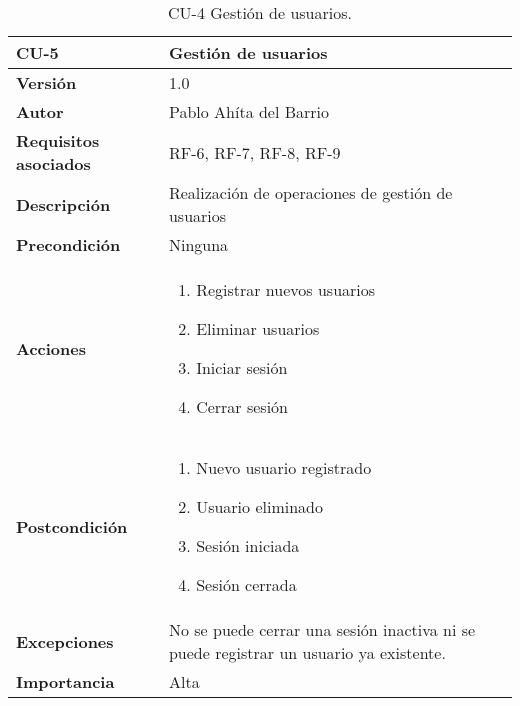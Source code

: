 \begin{table}[p]
	\centering
	\begin{tabularx}{\linewidth}{ p{} p{} }
		\toprule
		\textbf{CU-5}    & \textbf{Gestión de usuarios}\\
		\toprule
		\textbf{Versión}              & 1.0    \\
		\textbf{Autor}                & Pablo Ahíta del Barrio \\
		\textbf{Requisitos asociados} & RF-6, RF-7, RF-8, RF-9  \\
		\textbf{Descripción}          & Realización de operaciones de gestión de usuarios \\
		\textbf{Precondición}         & Ninguna \\
		\textbf{Acciones}             &
		\begin{enumerate}
			\def\labelenumi{\arabic{enumi}.}
			\tightlist
			\item Registrar nuevos usuarios
			\item Eliminar usuarios
			\item Iniciar sesión
			\item Cerrar sesión
		\end{enumerate}\\
		\textbf{Postcondición}        &  
		\begin{enumerate}
			\def\labelenumi{\arabic{enumi}.}
			\tightlist
			\item Nuevo usuario registrado
			\item Usuario eliminado
			\item Sesión iniciada
			\item Sesión cerrada
		\end{enumerate}\\
		\textbf{Excepciones}          & No se puede cerrar una sesión inactiva ni se puede registrar un usuario ya existente. \\
		\textbf{Importancia}          & Alta \\
		\bottomrule
	\end{tabularx}
	\caption{CU-4 Gestión de usuarios.}
\end{table}


